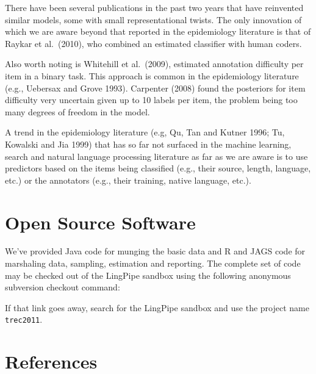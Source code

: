 \documentclass{article}
\begin{document}
There have been several publications in the past two years that have
reinvented similar models, some with small representational twists.
The only innovation of which we are aware beyond that reported in the
epidemiology literature is that of Raykar et al.~(2010), who combined
an estimated classifier with human coders.

Also worth noting is Whitehill et al.~(2009), estimated annotation
difficulty per item in a binary task.  This approach is common
in the epidemiology literature (e.g., Uebersax and Grove 1993).
Carpenter (2008) found the posteriors for item difficulty very
uncertain given up to 10 labels per item, the problem being too many
degrees of freedom in the model.  

A trend in the epidemiology literature (e.g, Qu, Tan and Kutner 1996;
Tu, Kowalski and Jia 1999) that has so far not surfaced in the machine
learning, search and natural language processing literature as far as
we are aware is to use predictors based on the items being classified
(e.g., their source, length, language, etc.)  or the annotators (e.g.,
their training, native language, etc.).


\section{Open Source Software}

We've provided Java code for munging the basic data and R and JAGS
code for marshaling data, sampling, estimation and reporting.  The
complete set of code may be checked out of the LingPipe sandbox
using the following anonymous subversion checkout command:

If that link goes away, search for the LingPipe sandbox and use
the project name {\tt trec2011}.

\section*{References}
\end{document}
